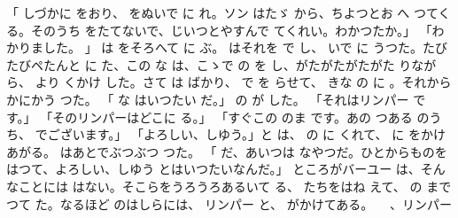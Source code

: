 \documentclass[a4paper,
tate,
book]
{jlreq}
\begin{document}
「 しづかに をおり、 をぬいで に れ。ソン はたゞ から、ちよつとお へ つてくる。そのうち をたてないで、じいつとやすんで てくれい。わかつたか。」
「わかりました。 」 は をそろへて に ぶ。 はそれを で し、 いで に うつた。たびたびペたんと に た、この な は、こゝで の を し、がたがたがたがた りながら、 より くかけ した。さて は ばかり、 で を らせて、 きな の に 。それから かにかう つた。
「 な はいつたい だ。」
   の が した。
「それはリンパー です。」
「そのリンパーはどこに る。」
「すぐこの のま です。あの つある のうち、  でございます。」
「よろしい、しゆう。」と は、 の に  くれて、 に をかけあがる。 はあとでぶつぶつ つた。
「 だ、あいつは なやつだ。ひとからものを はつて、よろしい、しゆう  とはいつたいなんだ。」
  ところがバーユー は、そんなことには はない。そこらをうろうろあるいて る、 たちをはね えて、 の まで つて た。なるほど のはしらには、 リンパー と、 がかけてある。 
             、リンパー 
\end{document}
